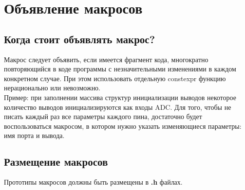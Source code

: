 \section{Объявление макросов}\label{mackros:0}
\subsection{Когда стоит объявлять макрос?}
Макрос следует объявить, если имеется фрагмент кода, многократно повторяющийся в коде программы с незначительными изменениями в каждом конкретном случае. При этом использовать отдельную constexpr функцию нерационально или невозможно.\\Пример: при заполнении массива структур инициализации выводов некоторое количество выводов инициализируются как входы ADC. Для того, чтобы не писать каждый раз все параметры каждого пина, достаточно будет воспользоваться макросом, в котором нужно указать изменяющиеся параметры: имя порта и вывода.

\subsection{Размещение макросов}
Прототипы макросов должны быть размещены в \textbf{.h} файлах.

